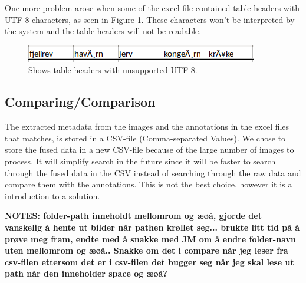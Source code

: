 \documentclass[USenglish]{uit-thesis}
\begin{document}

One more problem arose when some of the excel-file contained table-headers with UTF-8 characters, as seen in Figure \ref{fig:utf8}. These characters won't be interpreted by the system and the table-headers will not be readable.


\begin{figure}[b]
\centering
\includegraphics[width=\textwidth]{utf8.png}
\caption{Shows table-headers with unsupported UTF-8.}
\label{fig:utf8}
\end{figure}

\subsection{Comparing/Comparison} \label{ssec:imp_compare}


The extracted metadata from the images and the annotations in the excel files that matches, is stored in a CSV-file (Comma-separated Values). We chose to store the fused data in a new CSV-file because of the large number of images to process. It will simplify search in the future since it will be faster to search through the fused data in the CSV instead of searching through the raw data and compare them with the annotations. This is not the best choice, however it is a introduction to a solution.



\textbf{NOTES: folder-path inneholdt mellomrom og æøå, gjorde det vanskelig å hente ut bilder når pathen krøllet seg... brukte litt tid på å prøve meg fram, endte med å snakke med JM om å endre folder-navn uten mellomrom og æøå.. Snakke om det i compare når jeg leser fra csv-filen ettersom det er i csv-filen det bugger seg når jeg skal lese ut path når den inneholder space og æøå?}
\end{document}
